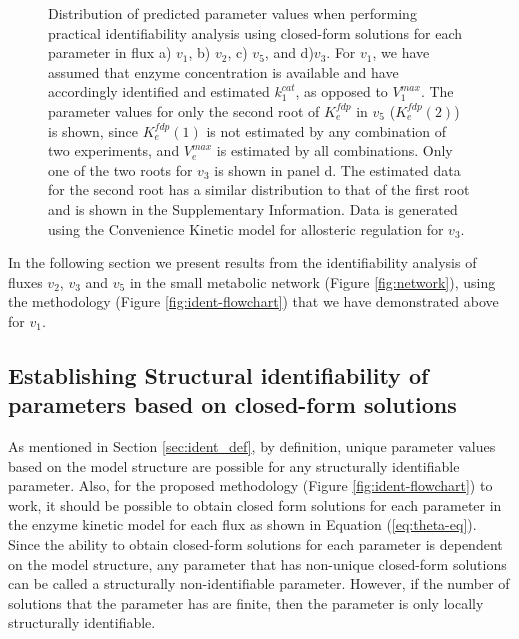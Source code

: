 \documentclass[10pt]{article}
\begin{document}
	\begin{figure}[!tbhp]
		\caption{Distribution of predicted parameter values when performing practical identifiability analysis using closed-form solutions for each parameter in flux a) $v_1$, b) $v_2$, c) $v_5$, and d)$v_3$. For $v_1$, we have assumed that enzyme concentration is available and have accordingly identified and estimated $k_1^{cat}$, as opposed to $V_1^{max}$. The parameter values for only the second root of $K_e^{fdp}$ in $v_5$ ($K_e^{fdp}(2)$) is shown, since $K_e^{fdp}(1)$ is not estimated by any combination of two experiments, and $V_e^{max}$ is estimated by all combinations. Only one of the two roots for $v_3$ is shown in panel d. The estimated data for the second root has a similar distribution to that of the first root and is shown in the Supplementary Information. Data is generated using the Convenience Kinetic model for allosteric regulation for $v_3$.}\label{fig:ident_values}
	\end{figure}
	
	In the following section we present results from the identifiability analysis of fluxes $v_2$, $v_3$ and $v_5$ in the small metabolic network (Figure \ref{fig:network}), using the methodology (Figure \ref{fig:ident-flowchart}) that we have demonstrated above for $v_1$. 
	
	\subsection{Establishing Structural identifiability of parameters based on closed-form solutions}\label{sec:proof}
	As mentioned in Section \ref{sec:ident_def}, by definition, unique parameter values based on the model structure are possible for any structurally identifiable parameter. Also, for the proposed methodology (Figure \ref{fig:ident-flowchart}) to work, it should be possible to obtain closed form solutions for each parameter in the enzyme kinetic model for each flux as shown in Equation (\ref{eq:theta-eq}). Since the ability to obtain closed-form solutions for each parameter is dependent on the model structure, any parameter that has non-unique closed-form solutions can be called a structurally non-identifiable parameter. However, if the number of solutions that the parameter has are finite, then the parameter is only locally structurally identifiable. 
	
\end{document}
